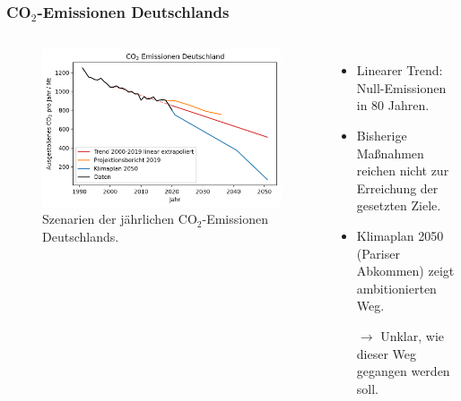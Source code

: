 \begin{frame}
  \frametitle{CO$_2$-Emissionen Deutschlands}
  \begin{columns}
      \begin{figure}
		    \centering
		    \includegraphics[width=\linewidth]{bilder/co2-emissions-de.png}
		    \caption{Szenarien der jährlichen CO$_2$-Emissionen Deutschlands.}
      \end{figure}
      \begin{itemize}
        \item Linearer Trend: Null-Emissionen in 80 Jahren.
        \item Bisherige Maßnahmen reichen nicht zur Erreichung der gesetzten Ziele.
        \item Klimaplan 2050 (Pariser Abkommen) zeigt ambitionierten Weg.
        \item[$\rightarrow$] Unklar, wie dieser Weg gegangen werden soll.
      \end{itemize}
    \end{columns}
\end{frame}

